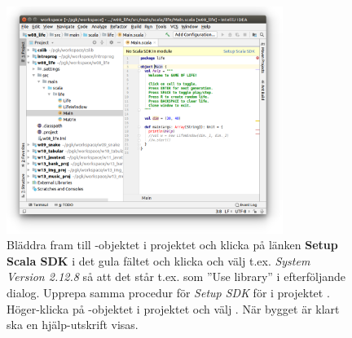 \begin{figure}
\centering
\includegraphics[width=0.8\textwidth]{../img/intellij/import78-setup-scala-sdk.png}

\caption{Bläddra fram till -objektet i projektet  och klicka på länken \textbf{Setup Scala SDK} i det gula fältet och klicka  och välj t.ex. \emph{System Version 2.12.8} så att det står t.ex.  som ''Use library'' i efterföljande dialog. Upprepa samma procedur för \emph{Setup SDK} för  i projektet . Höger-klicka på -objektet i projektet  och välj . När bygget är klart ska en hjälp-utskrift visas.}
\label{fig:idea:import78-setup-scala-sdk}
\end{figure}


%
%
%
